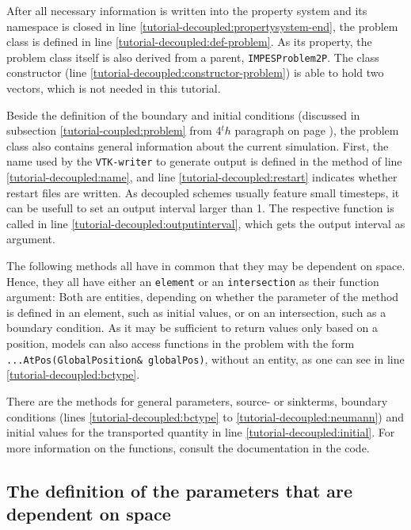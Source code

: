 After all necessary information is written into the property system and 
its namespace is closed in line \ref{tutorial-decoupled:propertysystem-end},
the problem class is defined in line \ref{tutorial-decoupled:def-problem}. 
As its property, the problem class itself is also derived from a parent, 
\texttt{IMPESProblem2P}. The class constructor (line 
\ref{tutorial-decoupled:constructor-problem}) is able to hold two vectors,
which is not needed in this tutorial.

Beside the definition of the boundary and initial conditions (discussed in 
subsection \ref{tutorial-coupled:problem} from 4$^th$ paragraph on page \pageref{tutorial-coupled:boundaryStart}), the problem class also contains
general information about the current simulation. First, the name used by
the \texttt{VTK-writer} to generate output is defined in the method of line
\ref{tutorial-decoupled:name}, and line \ref{tutorial-decoupled:restart} indicates
whether restart files are written. As decoupled schemes usually feature small 
timesteps, it can be usefull to set an output interval larger than 1. The respective function is called in line \ref{tutorial-decoupled:outputinterval}, which gets the output interval as argument.

The following methods all have in common that they may be dependent on space.
Hence, they all have either an \texttt{element} or an \texttt{intersection} as their
function argument: Both are \Dune entities, depending on whether the parameter of the method is defined in an element, such as 
    initial values, or on an intersection, such as a boundary condition. As it may be sufficient to return values only based on a position, \Dumux models can also access functions in the problem with the form \mbox{\texttt{...AtPos(GlobalPosition\& globalPos)}}, without an \Dune entity, as one can see in line \ref{tutorial-decoupled:bctype}.

There are the methods for general parameters, source- or
sinkterms, boundary conditions (lines \ref{tutorial-decoupled:bctype} to
\ref{tutorial-decoupled:neumann}) and initial values for the transported
quantity in line \ref{tutorial-decoupled:initial}. For more information
on the functions, consult the documentation in the code.

\subsection{The definition of the parameters that are dependent on space}\label{tutorial-decoupled:description-spatialParameters}

